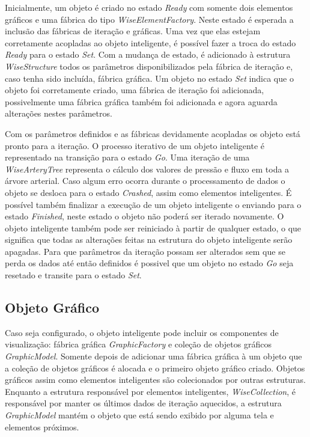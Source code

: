 \documentclass[
        english,			
        brazil			        %
        ,<...>]{abntbibufjf}
\begin{document}
Inicialmente, um objeto é criado no estado \textit{Ready} com somente dois elementos gráficos e uma fábrica do tipo \textit{WiseElementFactory}. Neste estado é esperada a inclusão das fábricas de iteração e gráficas. Uma vez que elas estejam corretamente acopladas ao objeto inteligente, é possível fazer a troca do estado \textit{Ready} para o estado \textit{Set}. Com a mudança de estado, é adicionado à estrutura \textit{WiseStructure} todos os parâmetros disponibilizados pela fábrica de iteração e, caso tenha sido incluída, fábrica gráfica. Um objeto no estado \textit{Set} indica que o objeto foi corretamente criado, uma fábrica de iteração foi adicionada, possivelmente uma fábrica gráfica também foi adicionada e agora aguarda alterações nestes parâmetros.

Com os parâmetros definidos e as fábricas devidamente acopladas os objeto está pronto para a iteração. O processo iterativo de um objeto inteligente é representado na transição para o estado \textit{Go}. Uma iteração de uma \textit{WiseArteryTree} representa o cálculo dos valores de pressão e fluxo em toda a árvore arterial. Caso algum erro ocorra durante o processamento de dados o objeto se desloca para o estado \textit{Crashed}, assim como elementos inteligentes. É possível também finalizar a execução de um objeto inteligente o enviando para o estado \textit{Finished}, neste estado o objeto não poderá ser iterado novamente. O objeto inteligente também pode ser reiniciado à partir de qualquer estado, o que significa que todas as alterações feitas na estrutura do objeto inteligente serão apagadas. Para que parâmetros da iteração possam ser alterados sem que se perda os dados até então definidos é possivel que um objeto no estado \textit{Go} seja resetado e transite para o estado \textit{Set}.

\subsection{Objeto Gráfico}\label{sec:objeto_grafico}

Caso seja configurado, o objeto inteligente pode incluir os componentes de visualização: fábrica gráfica \textit{GraphicFactory} e coleção de objetos gráficos \textit{GraphicModel}. Somente depois de adicionar uma fábrica gráfica à um objeto que a coleção de objetos gráficos é alocada e o primeiro objeto gráfico criado. Objetos gráficos assim como elementos inteligentes são colecionados por outras estruturas. Enquanto a estrutura responsável por elementos inteligentes, \textit{WiseCollection}, é responsável por manter os últimos dados de iteração aquecidos, a estrutura \textit{GraphicModel} mantém o objeto que está sendo exibido por alguma tela e elementos próximos.
\end{document}

